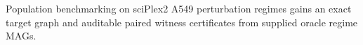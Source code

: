 Population benchmarking on sciPlex2 A549 perturbation regimes gains an exact target graph and auditable paired witness certificates from supplied oracle regime MAGs.